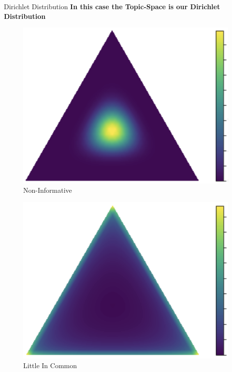 \documentclass[10pt]{beamer}
\begin{document}
\begin{frame}{Dirichlet Distribution}
  {\bf In this case the Topic-Space is our Dirichlet Distribution}

    \begin{multicols}{3}

  \begin{figure}
  \includegraphics[width=\columnwidth]{uninformative}
  \caption{Non-Informative}
  \end{figure}

  \columnbreak

  \hfill
    \begin{figure}
  \includegraphics[width=\columnwidth]{unique.png}
  \caption{Little In Common}
  \end{figure}


\end{multicols}
\end{frame}
\end{document}

